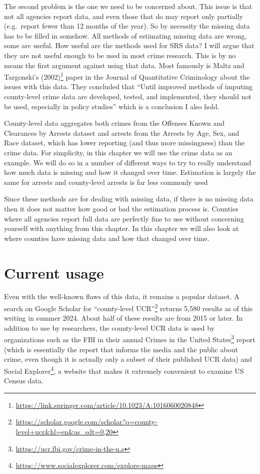 \documentclass[
]{krantz}
\renewcommand{\href}[2]{#2\footnote{\url{#1}}}
\begin{document}
The second problem is the one we need to be concerned about.
This issue is that not all agencies report data, and even
those that do may report only partially (e.g.~report fewer
than 12 months of the year). So by necessity the missing
data has to be filled in somehow. All methods of estimating
missing data are wrong, some are useful. How useful are the
methods used for SRS data? I will argue that they are not
useful enough to be used in most crime research. This is by
no means the first argument against using that data. Most
famously is
\href{https://link.springer.com/article/10.1023/A:1016060020848}{Maltz
and Targonski's (2002)} paper in the Journal of Quantitative
Criminology about the issues with this data. They concluded
that ``Until improved methods of imputing county-level crime
data are developed, tested, and implemented, they should not
be used, especially in policy studies'' which is a
conclusion I also hold.

County-level data aggregates both crimes from the Offenses
Known and Clearances by Arrests dataset and arrests from the
Arrests by Age, Sex, and Race dataset, which has lower
reporting (and thus more missingness) than the crime data.
For simplicity, in this chapter we will use the crime data
as an example. We will do so in a number of different ways
to try to really understand how much data is missing and how
it changed over time. Estimation is largely the same for
arrests and county-level arrests is far less commonly used

Since these methods are for dealing with missing data, if
there is no missing data then it does not matter how good or
bad the estimation process is. Counties where all agencies
report full data are perfectly fine to use without
concerning yourself with anything from this chapter. In this
chapter we will also look at where counties have missing
data and how that changed over time.

\section{Current usage}\label{current-usage}

Even with the well-known flaws of this data, it remains a
popular dataset. A search on Google Scholar for
\href{https://scholar.google.com/scholar?q=county-level+ucr&hl=en&as_sdt=0,20}{``county-level
UCR''} returns 5,580 results as of this writing in summer
2024. About half of these results are from 2015 or later. In
addition to use by researchers, the county-level UCR data is
used by organizations such as the FBI in their annual
\href{https://ucr.fbi.gov/crime-in-the-u.s}{Crimes in the
United States} report (which is essentially the report that
informs the media and the public about crime, even though it
is actually only a subset of their published UCR data) and
\href{https://www.socialexplorer.com/explore-maps}{Social
Explorer}, a website that makes it extremely convenient to
examine US Census data.
\end{document}
